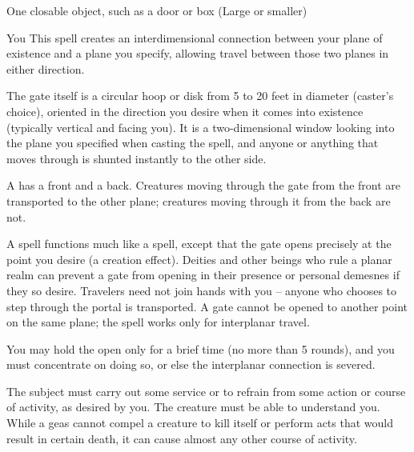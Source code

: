 \begin{spelltarget}{One closable object, such as a door or box (Large or smaller)}
\begin{spelltarget}{You}
\spelleffect This spell creates an interdimensional connection between your plane of existence and a plane you specify, allowing travel between those two planes in either direction.
\par The gate itself is a circular hoop or disk from 5 to 20 feet in diameter (caster's choice), oriented in the direction you desire when it comes into existence (typically vertical and facing you). It is a two-dimensional window looking into the plane you specified when casting the spell, and anyone or anything that moves through is shunted instantly to the other side.
\par A  has a front and a back. Creatures moving through the gate from the front are transported to the other plane; creatures moving through it from the back are not.
\par A  spell functions much like a  spell, except that the gate opens precisely at the point you desire (a creation effect). Deities and other beings who rule a planar realm can prevent a gate from opening in their presence or personal demesnes if they so desire. Travelers need not join hands with you -- anyone who chooses to step through the portal is transported. A gate cannot be opened to another point on the same plane; the spell works only for interplanar travel.
\par You may hold the  open only for a brief time (no more than 5 rounds), and you must concentrate on doing so, or else the interplanar connection is severed.

\spelleffect The subject must carry out some service or to refrain from some action or course of activity, as desired by you. The creature must be able to understand you. While a geas cannot compel a creature to kill itself or perform acts that would result in certain death, it can cause almost any other course of activity.


\end{spelltarget}
\end{spelltarget}
